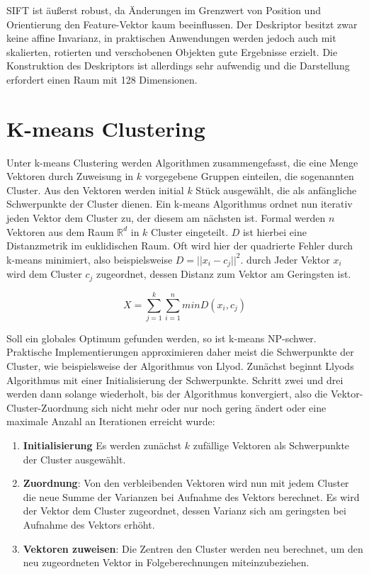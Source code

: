 SIFT ist äußerst robust, da Änderungen im Grenzwert von Position und Orientierung den Feature-Vektor kaum beeinflussen. Der Deskriptor besitzt zwar keine affine Invarianz, in praktischen Anwendungen werden jedoch auch mit skalierten, rotierten und verschobenen Objekten gute Ergebnisse erzielt. Die Konstruktion des Deskriptors ist allerdings sehr aufwendig und die Darstellung erfordert einen Raum mit 128 Dimensionen. 

\section{K-means Clustering}

Unter k-means Clustering werden Algorithmen zusammengefasst, die eine Menge Vektoren durch Zuweisung in $k$ vorgegebene Gruppen einteilen, die sogenannten Cluster. Aus den Vektoren werden initial $k$ Stück ausgewählt, die als anfängliche Schwerpunkte der Cluster dienen. Ein k-means Algorithmus ordnet nun iterativ jeden Vektor dem Cluster zu, der diesem am nächsten ist. Formal werden $n$ Vektoren aus dem Raum $\mathbb{R}^{d}$ in $k$ Cluster eingeteilt. $D$ ist hierbei eine Distanzmetrik im euklidischen Raum. Oft wird hier der quadrierte Fehler durch k-means minimiert, also beispielsweise $D = ||x_{i} - c_{j}||^{2}$. durch Jeder Vektor $x_{i}$ wird dem Cluster $c_{j}$ zugeordnet, dessen Distanz zum Vektor am Geringsten ist.

$$ X = \sum_{j=1}^{k} \sum_{i=1}^{n} min D(x_{i}, c_{j}) $$

Soll ein globales Optimum gefunden werden, so ist k-means NP-schwer. Praktische Implementierungen approximieren daher meist die Schwerpunkte der Cluster, wie beispielsweise der Algorithmus von Llyod. Zunächst beginnt Llyods Algorithmus mit einer Initialisierung der Schwerpunkte. Schritt zwei und drei werden dann solange wiederholt, bis der Algorithmus konvergiert, also die Vektor-Cluster-Zuordnung sich nicht mehr oder nur noch gering ändert oder eine maximale Anzahl an Iterationen erreicht wurde: 

\begin{enumerate}
	\item \textbf{Initialisierung} Es werden zunächst $k$ zufällige Vektoren als Schwerpunkte der Cluster ausgewählt.
	\item \textbf{Zuordnung}: Von den verbleibenden Vektoren wird nun mit jedem Cluster die neue Summe der Varianzen bei Aufnahme des Vektors berechnet. Es wird der Vektor dem Cluster zugeordnet, dessen Varianz sich am geringsten bei Aufnahme des Vektors erhöht.
	\item \textbf{Vektoren zuweisen}: Die Zentren den Cluster werden neu berechnet, um den neu zugeordneten Vektor in Folgeberechnungen miteinzubeziehen.
\end{enumerate}

